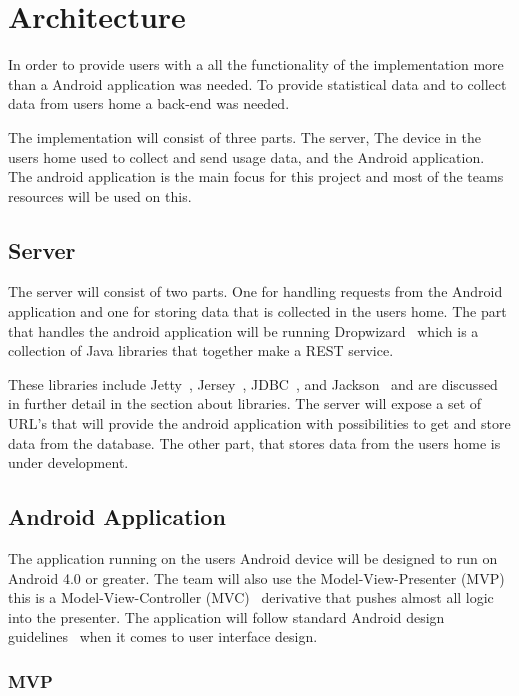 \section{Architecture}
In order to provide users with a all the functionality of the implementation more than a Android application was needed.
To provide statistical data and to collect data from users home a back-end was needed.

The implementation will consist of three parts. The server, The device in the users home used to 
collect and send usage data, and the Android application. The android application is the main focus for 
this project and most of the teams resources will be used on this.

\subsection{Server}
The server will consist of two parts. One for handling requests from the Android application and one for storing data that is collected in the users home. 
The part that handles the android application will be running Dropwizard~\cite{dropwizard} which is a collection of Java libraries that together make a REST service. 

These libraries include Jetty~\cite{jetty}, Jersey~\cite{jersey}, JDBC~\cite{jdbc}, and Jackson~\cite{jackson} and are discussed in further detail in the section about libraries.
The server will expose a set of URL’s that will provide the android application with 
possibilities to get and store data from the database. The other part, that stores data from the users home is under development.

\subsection{Android Application}
The application running on the users Android device will be designed to run on Android 4.0 or greater.
The team will also use the Model-View-Presenter (MVP)~\cite{mvp} this is a Model-View-Controller (MVC)~\cite{mvc} derivative 
that pushes almost all logic into the presenter. The application will follow standard Android design guidelines~\cite{androidgui}
when it comes to user interface design.

\subsubsection{MVP}

